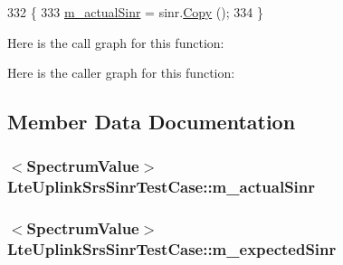 \begin{DoxyCode}
332 \{
333   \hyperlink{classLteUplinkSrsSinrTestCase_a4598a42aea09e59348362789f51e564e}{m\_actualSinr} = sinr.\hyperlink{classns3_1_1SpectrumValue_a2b5dc6d7a862e9036b2edd01cadaec69}{Copy} ();
334 \}
\end{DoxyCode}


Here is the call graph for this function\+:




Here is the caller graph for this function\+:




\subsection{Member Data Documentation}
\subsubsection[{\texorpdfstring{m\+\_\+actual\+Sinr}{m_actualSinr}}]{$<${\bf Spectrum\+Value}$>$ Lte\+Uplink\+Srs\+Sinr\+Test\+Case\+::m\+\_\+actual\+Sinr\hspace{0.3cm}{\ttfamily [private]}}\hypertarget{classLteUplinkSrsSinrTestCase_a4598a42aea09e59348362789f51e564e}{}\label{classLteUplinkSrsSinrTestCase_a4598a42aea09e59348362789f51e564e}
\subsubsection[{\texorpdfstring{m\+\_\+expected\+Sinr}{m_expectedSinr}}]{$<${\bf Spectrum\+Value}$>$ Lte\+Uplink\+Srs\+Sinr\+Test\+Case\+::m\+\_\+expected\+Sinr\hspace{0.3cm}{\ttfamily [private]}}\hypertarget{classLteUplinkSrsSinrTestCase_aa70bf173e293941357c8fdb32a0b403c}{}\label{classLteUplinkSrsSinrTestCase_aa70bf173e293941357c8fdb32a0b403c}
